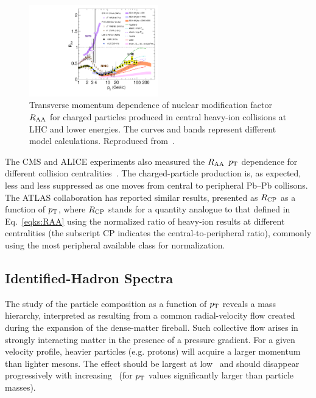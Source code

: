 \begin{figure}
\centering
\includegraphics[width=0.5\textwidth]{particlefigs/CMSRAA.pdf}
\caption{Transverse momentum dependence of nuclear modification factor $R_{\rm AA}$ for charged particles produced in central heavy-ion collisions at LHC and lower energies. The curves and bands represent different model calculations. Reproduced from~\cite{CMS:2012aa}.}
\label{figks:CMSRAA}
\end{figure}

The CMS and ALICE experiments also measured the $R_{\rm AA}$ $p_{\rm T}$ dependence for different collision centralities~\cite{CMS:2012aa,Abelev:2012hxa}. The charged-particle production is, as expected, less and less suppressed as one moves from central to peripheral Pb--Pb collisons. The ATLAS collaboration has reported similar results, presented as $R_{\rm CP}$ as a function of $p_{\rm T}$, where $R_{\rm CP}$ stands for a quantity analogue  to that defined in Eq.~\ref{eqks:RAA} using the normalized ratio of heavy-ion results at different centralities (the subscript CP indicates the central-to-peripheral ratio), commonly using the most peripheral available class for normalization.
\subsection{Identified-Hadron Spectra}
\label{subsecks:identspectra}
The study of the particle composition as a function of $p_{\rm T}$ reveals a mass hierarchy, interpreted as resulting from a common radial-velocity flow created during the expansion of the dense-matter fireball. Such collective flow arises in strongly interacting matter in the presence of a pressure gradient. For a given velocity profile, heavier particles (e.g. protons) will acquire a larger momentum than lighter mesons. The effect should be largest at low \pt\ and should disappear progressively with increasing \pt\ (for $p_{\rm T}$ values significantly larger than particle masses).

